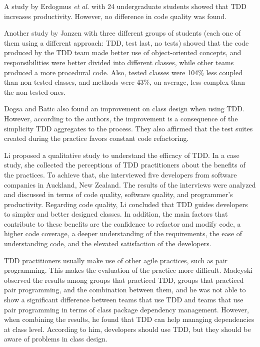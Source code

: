 \documentclass[times]{elsarticle}
\begin{document}
A study by Erdogmus \textit{et al.} \cite{erdogmus-morisio} with 24 undergraduate students
showed that TDD increases productivity. However, no difference in code quality
was found.

Another study by Janzen \cite{janzen-saiedian} with three different groups
of students (each one of them using a different approach: TDD, test last, no tests)
showed that the code produced by the TDD team made better use of object-oriented
concepts, and responsibilities were better divided into different classes,
while other teams produced a more procedural code. Also, tested classes were
104\% less coupled than non-tested classes, and methods were 43\%, on average, less complex
than the non-tested ones.

Dogsa and Batic \cite{dogsa-batic} also found an improvement on class design when
using TDD. However, according to the authors, the improvement is a consequence of the simplicity
TDD aggregates to the process. They also affirmed that the test suites created during
the practice favors constant code refactoring.

Li \cite{angela-li} proposed a qualitative study to understand the efficacy of TDD.
In a case study, she collected the perceptions of TDD practitioners about the
benefits of the practices. To achieve that, she interviewed five developers
from software companies in Auckland, New Zealand. The results of the interviews
were analyzed and discussed in terms of code quality, software quality, and
programmer's productivity. Regarding code quality, Li concluded that TDD
guides developers to simpler and better designed classes. In addition, the main
factors that contribute to these benefits are the confidence to refactor and
modify code, a higher code coverage, a deeper understanding of the requirements,
the ease of understanding code, and the elevated
satisfaction of the developers.

TDD practitioners usually make use of other agile practices, such as
pair programming. This makes the evaluation of the practice more difficult.
Madeyski \cite{madeyski-package-dependencies} observed the results
among groups that practiced TDD, groups that practiced pair programming,
and the combination between them, and he was not able to show a significant
difference between teams that use TDD and teams that use pair programming
in terms of class package dependency management. However, when combining
the results, he found that TDD can help managing dependencies at class level.
According to him, developers should use TDD, but they should be aware of 
problems in class design.
\end{document}
